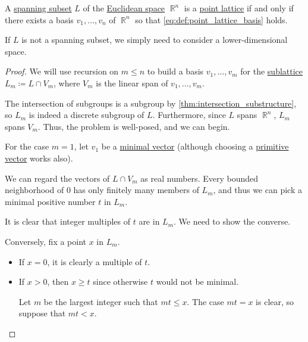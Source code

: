 \begin{proposition}\label{thm:point_lattice_via_basis}
  A \hyperref[def:semimodule/generated]{spanning subset} \( L \) of the \hyperref[def:euclidean_space]{Euclidean space} \( \BbbR^n \) is a \hyperref[def:point_lattice]{point lattice} if and only if there exists a basis \( v_1, \ldots, v_n \) of \( \BbbR^n \) so that \eqref{eq:def:point_lattice_basis} holds.
\end{proposition}
\begin{comments}
  \item If \( L \) is not a spanning subset, we simply need to consider a lower-dimensional space.
\end{comments}
\begin{proof}
  \SufficiencySubProof{} We will use recursion on \( m \leq n \) to build a basis \( v_1, \ldots, v_m \) for the \hyperref[def:point_sublattice]{sublattice} \( L_m \coloneqq L \cap V_m \), where \( V_m \) is the linear span of \( v_1, \ldots, v_m \).

  The intersection of subgroups is a subgroup by \cref{thm:intersection_substructure}, so \( L_m \) is indeed a discrete subgroup of \( L \). Furthermore, since \( L \) spans \( \BbbR^n \), \( L_m \) spans \( V_m \). Thus, the problem is well-posed, and we can begin.

   For the case \( m = 1 \), let \( v_1 \) be a \hyperref[def:minimal_lattice_vector]{minimal vector} (although choosing a \hyperref[def:primitive_lattice_vector]{primitive vector} works also).

  We can regard the vectors of \( L \cap V_m \) as real numbers. Every bounded neighborhood of \( 0 \) has only finitely many members of \( L_m \), and thus we can pick a minimal positive number \( t \) in \( L_m \).

  It is clear that integer multiples of \( t \) are in \( L_m \). We need to show the converse.

  Conversely, fix a point \( x \) in \( L_m \).
  \begin{itemize}
    \item If \( x = 0 \), it is clearly a multiple of \( t \).
    \item If \( x > 0 \), then \( x \geq t \) since otherwise \( t \) would not be minimal.

    Let \( m \) be the largest integer such that \( mt \leq x \). The case \( mt = x \) is clear, so suppose that \( mt < x \).


\end{itemize}
\end{proof}
